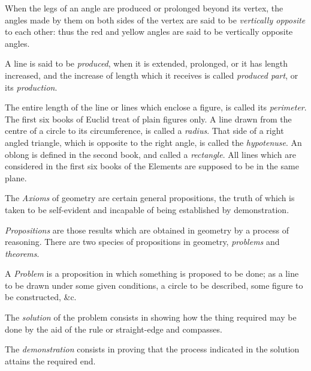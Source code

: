 \documentclass{byrne-book}
\begin{document}
When the legs of an angle are produced or prolonged beyond its vertex, the angles made by them on both sides of the vertex are said to be \emph{vertically opposite} to each other: thus the red and yellow angles are said to be vertically opposite angles.


A line is said to be \emph{produced}, when it is extended, prolonged, or it has length increased, and the increase of length which it receives is called \emph{produced part}, or its \emph{production}.

The entire length of the line or lines which enclose a figure, is called its \emph{perimeter}. The first six books of Euclid treat of plain figures only. A line drawn from the centre of a circle to its circumference, is called a \emph{radius}. That side of a right angled triangle, which is opposite to the right angle, is called the \emph{hypotenuse}. An oblong is defined in the second book, and called a \emph{rectangle}. All lines which are considered in the first six books of the Elements are supposed to be in the same plane.


The \emph{Axioms} of geometry are certain general propositions, the truth of which is taken to be self-evident and incapable of being established by demonstration.

\emph{Propositions} are those results which are obtained in geometry by a process of reasoning. There are two species of propositions in geometry, \emph{problems} and \emph{theorems}.

A \emph{Problem} is a proposition in which something is proposed to be done; as a line to be drawn under some given conditions, a circle to be described, some figure to be constructed, \&c.

The \emph{solution} of the problem consists in showing how the thing required may be done by the aid of the rule or straight-edge and compasses.

The \emph{demonstration} consists in proving that the process indicated in the solution attains the required end.
\end{document}
